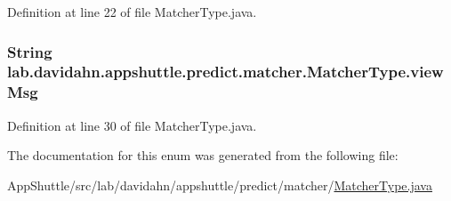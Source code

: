 \-Definition at line 22 of file \-Matcher\-Type.\-java.

\hypertarget{enumlab_1_1davidahn_1_1appshuttle_1_1predict_1_1matcher_1_1_matcher_type_a79251e3df8049f6156a3675e657bfd26}{
\subsubsection[{view\-Msg}]{\setlength{\rightskip}{0pt plus 5cm}\-String {\bf lab.\-davidahn.\-appshuttle.\-predict.\-matcher.\-Matcher\-Type.\-view\-Msg}}}\label{enumlab_1_1davidahn_1_1appshuttle_1_1predict_1_1matcher_1_1_matcher_type_a79251e3df8049f6156a3675e657bfd26}


\-Definition at line 30 of file \-Matcher\-Type.\-java.



\-The documentation for this enum was generated from the following file\-:\begin{DoxyCompactItemize}
\item 
\-App\-Shuttle/src/lab/davidahn/appshuttle/predict/matcher/\hyperlink{_matcher_type_8java}{\-Matcher\-Type.\-java}\end{DoxyCompactItemize}
